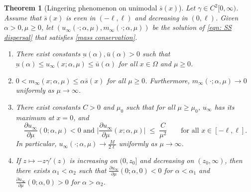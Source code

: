 \documentclass{article}
\newtheorem{theorem}{Theorem}[section]
\begin{document}
\begin{theorem}[Lingering phenomenon on unimodal $\bar s(x)$]\label{thm:lingering}
Let $\gamma\in C^2[0,\infty)$. Assume that $\bar s(x)$ is even in $(-\ell,\ell)$ and decreasing in $(0,\ell)$. Given $\alpha>0,\mu\ge0$, let $(u_\infty(\cdot;\alpha,\mu),m_\infty(\cdot;\alpha,\mu))$ be the solution of \eqref{eqn: SS dispersal} that satisfies \eqref{mass conservation}. 
\begin{enumerate}
\item[(i)] There exist constants $\underbar{u}(\alpha),\bar u(\alpha) >0$ such that $ \underbar u(\alpha)\le u_\infty(x;\alpha,\mu)\le \bar u(\alpha)$ for all $x\in \Omega$ and $\mu\ge 0$.
\item[(ii)]  $0<m_\infty(x;\alpha,\mu)\le \alpha\bar s(x)$ for all $\mu\ge 0$. Furthermore, $m_\infty(\cdot;\alpha,\mu)\to 0$ uniformly as $\mu\to\infty$.

    \item [(iii)] There exist constants $C>0$ and $\mu_0$ such that for all $\mu\ge \mu_0$, $u_\infty$ has its maximum at $x=0$, and
\[
    \frac{\partial u_\infty}{\partial \mu}(0;\alpha,\mu)<0 \text{ and } \bigl|\frac{\partial u_\infty}{\partial \mu}(x;\alpha,\mu)\bigr| \;\le\; \frac{C}{\mu^2}
    \qquad \text{for all } x\in[-\ell,\ell].
\]
In particular, $u_\infty(\cdot;\alpha,\mu)\to \frac{M}{2\ell}$ uniformly as $\mu\to\infty$. 
    
    \item[(iv)] If $z\mapsto -z\gamma'(z)$ is increasing on $(0,z_0]$ and decreasing on $(z_0,\infty)$, then there exists $\alpha_1<\alpha_2$ such that $\frac{\partial u_\infty}{\partial \mu}(0;\alpha,0)<0$ for $\alpha <\alpha_1$ and $\frac{\partial u_\infty}{\partial \mu}(0;\alpha,0)>0$ for $\alpha >\alpha_2$.
\end{enumerate}
\end{theorem}
\end{document}
